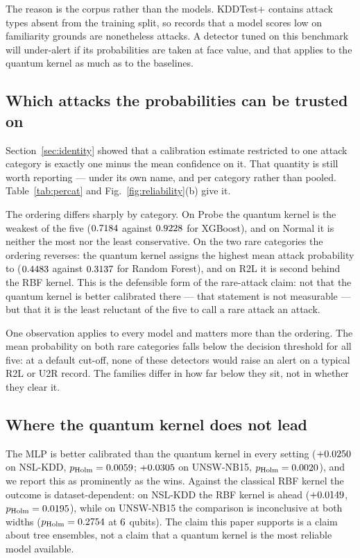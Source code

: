 \documentclass[journal]{IEEEtran}
\begin{document}
The reason is the corpus rather than the models. KDDTest+ contains attack
types absent from the training split, so records that a model scores low on
familiarity grounds are nonetheless attacks. A detector tuned on this
benchmark will under-alert if its probabilities are taken at face value,
and that applies to the quantum kernel as much as to the baselines.



\subsection{Which attacks the probabilities can be trusted on}
Section~\ref{sec:identity} showed that a calibration estimate restricted to
one attack category is exactly one minus the mean confidence on it. That
quantity is still worth reporting --- under its own name, and per category
rather than pooled. Table~\ref{tab:percat} and
Fig.~\ref{fig:reliability}(b) give it.

The ordering differs sharply by category. On Probe the quantum kernel is the
weakest of the five ($0.7184$ against $0.9228$ for XGBoost),
and on Normal it is neither the most nor the least conservative. On the two
rare categories the ordering reverses: the quantum kernel assigns the
highest mean attack probability to \catUtoRName{} ($0.4483$ against
$0.3137$ for Random Forest), and on R2L it is second behind the RBF
kernel. This is the defensible form of the rare-attack claim: not that the
quantum kernel is better calibrated there --- that statement is not
measurable --- but that it is the least reluctant of the five to call a
rare attack an attack.

One observation applies to every model and matters more than the ordering.
The mean probability on both rare categories falls below the decision
threshold for all five: at a default cut-off, none of these detectors would
raise an alert on a typical R2L or U2R record. The families differ in how
far below they sit, not in whether they clear it.

\subsection{Where the quantum kernel does not lead}
The MLP is better calibrated than the quantum kernel in every setting
($+0.0250$ on NSL-KDD, $p_{\text{Holm}}=0.0059$; $+0.0305$ on
UNSW-NB15, $p_{\text{Holm}}=0.0020$), and we report this as
prominently as the wins. Against the classical RBF kernel the outcome is
dataset-dependent: on NSL-KDD the RBF kernel is ahead ($+0.0149$,
$p_{\text{Holm}}=0.0195$), while on UNSW-NB15 the comparison is
inconclusive at both widths ($p_{\text{Holm}}=0.2754$ at
$6$ qubits). The claim this paper supports is a claim about tree
ensembles, not a claim that a quantum kernel is the most reliable model
available.
\end{document}
